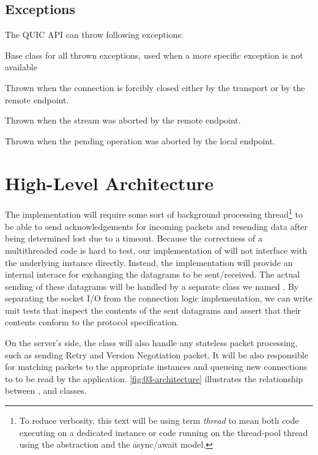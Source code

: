 \subsection{Exceptions}

The QUIC API can throw following exceptions:

\begin{description}

     Base class for all thrown exceptions, used when a more specific exception is not available

     Thrown when the connection is forcibly closed either by the transport or by the remote endpoint.

     Thrown when the stream was aborted by the remote endpoint.

     Thrown when the pending operation was aborted by the local endpoint.

\end{description}

\section{High-Level Architecture}

The \QuicConnection{} implementation will require some sort of background processing
thread\footnote{To reduce verbosity, this text will be using term \textit{thread} to mean both code
  executing on a dedicated  instance or code running on the thread-pool thread using
  the  abstraction and the \dotnet{} async/await model.} to be able to send
acknowledgements for incoming packets and resending data after being determined lost due to a
timeout. Because the correctness of a multithreaded code is hard to test, our implementation of
\QuicConnection{} will not interface with the underlying \Socket{} instance directly. Instead,
the implementation will provide an internal interace for exchanging the datagrams to be
sent/received. The actual sending of these datagrams will be handled by a separate class we named
\QuicSocketContext{}. By separating the socket I/O from the connection logic implementation, we can
write unit tests that inspect the contents of the sent datagrams and assert that their contents
conform to the protocol specification.

On the server's side, the \QuicSocketContext{} class will also handle any stateless packet
processing, such as sending Retry and Version Negotiation packet. It will be also responsible for
matching packets to the appropriate \QuicConnection{} instances and queueing new connections to \QuicListener{} to be read by the application. \autoref{fig:03-architecture} illustrates the relationship between \QuicSocketContext{}, \QuicConnection{} and \QuicListener{} classes.

